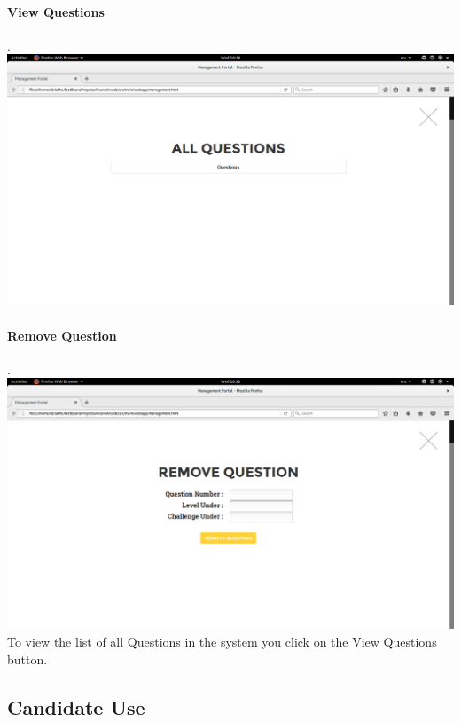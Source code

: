 \documentclass[english]{article}
\begin{document}
\paragraph{View Questions}. \\ \newline
				\includegraphics[width=\linewidth]{ViewQuestions.png}				\newline


\paragraph{Remove Question}. \\ \newline
				\includegraphics[width=\linewidth]{RemoveQuestion.png}				\newline
				To view the list of all Questions in the system you click on the View Questions button.\newline


				
			
			\newpage
		\subsection{Candidate Use}
\end{document}
